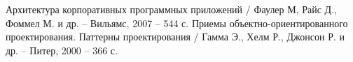 \documentclass[a4paper, 12pt]{article}        %
\begin{document}
\newpage
\section*{}

\begin{thebibliography}{00}

 Архитектура корпоративных программных приложений / Фаулер М, Райс Д., Фоммел М. и др. --  Вильямс, 2007 -- 544 с.
 Приемы объектно-ориентированного проектирования. Паттерны проектирования / Гамма Э., Хелм Р., Джонсон Р. и др. --   Питер, 2000 -- 366 с.
\end{thebibliography}

\end{document}
